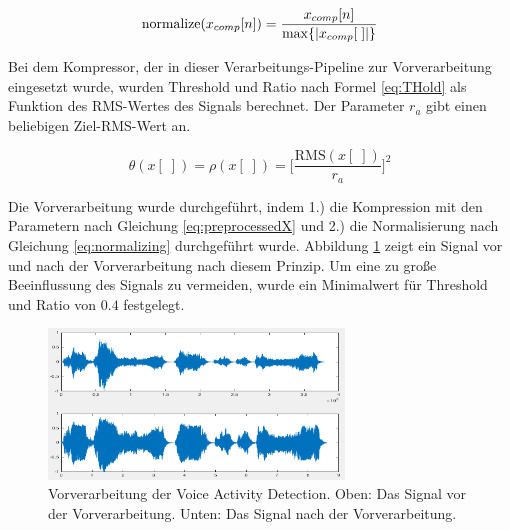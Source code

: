 \begin{equation}
\text{normalize}(x_{comp}[n]) = \frac{x_{comp}[n]}{\operatorname*{max}\{|x_{comp}[\;]|\}}
\label{eq:normalizing}
\end{equation}

Bei dem Kompressor, der in dieser Verarbeitungs-Pipeline zur Vorverarbeitung eingesetzt wurde, wurden Threshold und Ratio nach Formel \ref{eq:THold} als Funktion des RMS-Wertes des Signals berechnet. Der Parameter $r_a$ gibt einen beliebigen Ziel-RMS-Wert an.

\begin{equation}
\theta(x[\;]) = \rho(x[\;])  = \bigg[\frac{\text{RMS}(x[\;])}{r_a}\bigg]^{2}
\label{eq:THold}
\end{equation}

Die Vorverarbeitung wurde durchgeführt, indem 1.) die Kompression mit den Parametern nach Gleichung \ref{eq:preprocessedX} und 2.) die Normalisierung nach Gleichung \ref{eq:normalizing} durchgeführt wurde. Abbildung \ref{img:compressing01} zeigt ein Signal vor und nach der Vorverarbeitung nach diesem Prinzip. Um eine zu große Beeinflussung des Signals zu vermeiden, wurde ein Minimalwert für Threshold und Ratio von $0.4$ festgelegt.

\begin{figure}[h]
	\centering
	\includegraphics[width=0.7\textwidth]{bilder/compressing01.png}
	\caption[Vorverarbeitung der Voice Activity Detection]{Vorverarbeitung der Voice Activity Detection. Oben: Das Signal vor der Vorverarbeitung. Unten: Das Signal nach der Vorverarbeitung.}
	\label{img:compressing01}
\end{figure}

